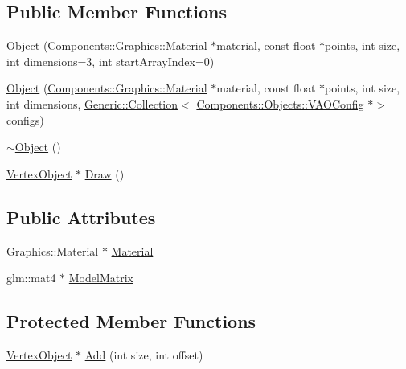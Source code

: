 \subsection*{Public Member Functions}
\begin{DoxyCompactItemize}
\item 
\mbox{\hyperlink{classEngine_1_1Objects_1_1Object_a4798ee926dcbd761e7e88fdeb73f2f0a}{Object}} (\mbox{\hyperlink{classEngine_1_1Components_1_1Graphics_1_1Material}{Components\+::\+Graphics\+::\+Material}} $\ast$material, const float $\ast$points, int size, int dimensions=3, int start\+Array\+Index=0)
\item 
\mbox{\hyperlink{classEngine_1_1Objects_1_1Object_af69cb6c57955cec7b1a94604136a4c51}{Object}} (\mbox{\hyperlink{classEngine_1_1Components_1_1Graphics_1_1Material}{Components\+::\+Graphics\+::\+Material}} $\ast$material, const float $\ast$points, int size, int dimensions, \mbox{\hyperlink{classGeneric_1_1Collection}{Generic\+::\+Collection}}$<$ \mbox{\hyperlink{structEngine_1_1Components_1_1Objects_1_1VAOConfig}{Components\+::\+Objects\+::\+V\+A\+O\+Config}} $\ast$$>$ configs)
\item 
\mbox{\hyperlink{classEngine_1_1Objects_1_1Object_a5fc9cc004cae8e63c4fb1d2b6d1cea88}{$\sim$\+Object}} ()
\item 
\mbox{\hyperlink{classEngine_1_1Components_1_1Objects_1_1VertexObject_a2cd67c7ea4baefd945c5045d2a775a5d}{Vertex\+Object}} $\ast$ \mbox{\hyperlink{classEngine_1_1Components_1_1Objects_1_1VertexObject_a53a8f546ee082720579e2c33be6cedec}{Draw}} ()
\end{DoxyCompactItemize}
\subsection*{Public Attributes}
\begin{DoxyCompactItemize}
\item 
Graphics\+::\+Material $\ast$ \mbox{\hyperlink{classEngine_1_1Components_1_1Objects_1_1VertexObject_a86c1fced4cdc5e59a66a635390a17eca}{Material}}
\item 
glm\+::mat4 $\ast$ \mbox{\hyperlink{classEngine_1_1Objects_1_1Object_acf41cc091fa270053245ed26bc28c8a4}{Model\+Matrix}}
\end{DoxyCompactItemize}
\subsection*{Protected Member Functions}
\begin{DoxyCompactItemize}
\item 
\mbox{\hyperlink{classEngine_1_1Components_1_1Objects_1_1VertexObject_a2cd67c7ea4baefd945c5045d2a775a5d}{Vertex\+Object}} $\ast$ \mbox{\hyperlink{classEngine_1_1Components_1_1Objects_1_1VertexObject_a18550cae56ca1066792528a7dcf5d28a}{Add}} (int size, int offset)
\end{DoxyCompactItemize}
